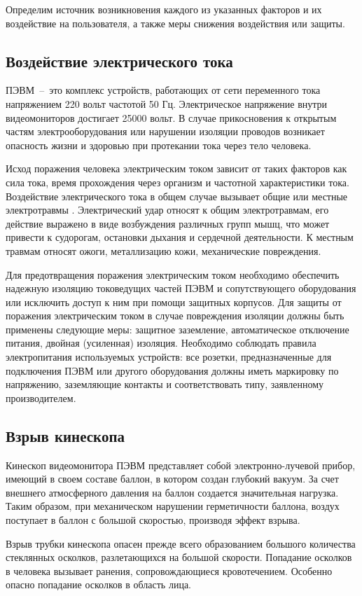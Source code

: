 \documentclass[14pt,oneside,final]{extreport}
\begin{document}
	Определим источник возникновения каждого из указанных факторов и их воздействие на пользователя, а также меры снижения воздействия или защиты.
	\subsection{Воздействие электрического тока}
	ПЭВМ~--~это комплекс устройств, работающих от сети переменного тока напряжением 220 вольт частотой 50 Гц. Электрическое напряжение внутри видеомониторов достигает 25000 вольт. В случае прикосновения к открытым частям электрооборудования или нарушении изоляции проводов возникает опасность жизни и здоровью при протекании тока через тело человека. 
	
	Исход поражения человека электрическим током зависит от таких факторов как сила тока, время прохождения через организм и частотной характеристики тока. Воздействие электрического тока в общем случае вызывает общие или местные электротравмы  \cite{book:BZD}. Электрический удар относят к общим электротравмам, его действие выражено в виде возбуждения различных групп мышц, что может привести к судорогам, остановки дыхания и сердечной деятельности. К местным травмам относят ожоги, металлизацию кожи, механические повреждения. 
	
	Для предотвращения поражения электрическим током необходимо обеспечить надежную изоляцию токоведущих частей ПЭВМ и сопутствующего оборудования или исключить доступ к ним при помощи защитных корпусов. Для защиты от поражения электрическим током в случае повреждения изоляции должны быть применены следующие меры: защитное заземление, автоматическое отключение питания, двойная (усиленная) изоляция. Необходимо соблюдать правила электропитания используемых устройств: все розетки, предназначенные для подключения ПЭВМ или другого оборудования должны иметь маркировку по напряжению, заземляющие контакты и соответствовать типу, заявленному производителем. 
	\subsection{Взрыв кинескопа}
	Кинескоп видеомонитора ПЭВМ представляет собой электронно-лучевой прибор, имеющий в своем составе баллон, в котором создан глубокий вакуум. За счет внешнего атмосферного давления на баллон создается значительная нагрузка. Таким образом, при механическом нарушении герметичности баллона, воздух поступает в баллон с большой скоростью, производя эффект взрыва. 
	
	Взрыв трубки кинескопа опасен прежде всего образованием большого количества стеклянных осколков, разлетающихся на большой скорости. Попадание осколков в человека вызывает ранения, сопровождающиеся кровотечением. Особенно опасно попадание осколков в область лица.
	
\end{document}
